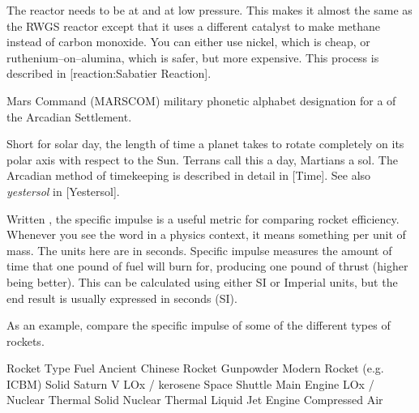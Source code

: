 \startformula
{}
\stopformula

The reactor needs to be at  and at low pressure. This makes it almost the same as the RWGS reactor except that it uses a different catalyst to make methane instead of carbon monoxide. You can either use nickel, which is cheap, or ruthenium--on--alumina, which is safer, but more expensive. This process is described in [reaction:Sabatier Reaction].

Mars Command (MARSCOM) military phonetic alphabet designation for a  of the Arcadian Settlement.

Short for solar day, the length of time a planet takes to rotate completely on its polar axis with respect to the Sun. Terrans call this a day, Martians a sol. The Arcadian method of timekeeping is described in detail in [Time]. See also {\it yestersol} in [Yestersol]. 

Written , the specific impulse is a useful metric for comparing rocket efficiency. Whenever you see the word  in a physics context, it means something per unit of mass. The units here are in seconds. Specific impulse measures the amount of time that one pound of fuel will burn for, producing one pound of thrust (higher being better). This can be calculated using either SI or Imperial units, but the end result is usually expressed in seconds (SI).

As an example, compare the specific impulse of some of the different types of rockets.
\crlf

{
    \bTABLE[split=repeat,option=stretch]%
    \setupTABLE[row][each][align=center]

    \bTABLEhead
    \bTR
      \bTH Rocket Type \eTH
      \bTH Fuel \eTH
      \bTH {} \eTH
    \eTR
    \eTABLEhead
    \bTABLEbody
    \bTR
      \bTC Ancient Chinese Rocket \eTC
      \bTC Gunpowder \eTC
       \eTC
    \eTR
    \bTR
      \bTC Modern Rocket (e.g. ICBM) \eTC
      \bTC Solid \eTC
       \eTC
    \eTR
    \bTR
      \bTC Saturn V \eTC
      \bTC LOx / kerosene \eTC
       \eTC
    \eTR
    \bTR
      \bTC Space Shuttle Main Engine \eTC
      \bTC LOx /  \eTC
       \eTC
    \eTR
    \bTR
      \bTC Nuclear Thermal \eTC
      \bTC Solid \eTC
       \eTC
    \eTR
    \bTR
      \bTC Nuclear Thermal \eTC
      \bTC Liquid \eTC
       \eTC
    \eTR
    \bTR
      \bTC Jet Engine \eTC
      \bTC Compressed Air \eTC
       \eTC
    \eTR
\eTABLEbody
\eTABLE
}

